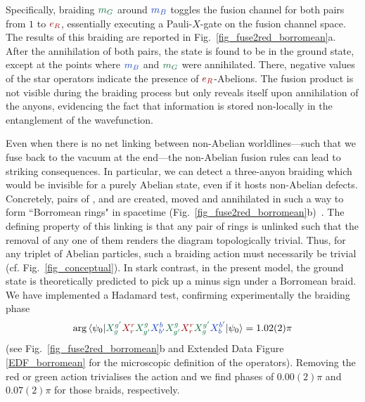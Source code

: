 \documentclass[nofootinbib,pra,twocolumn,showpacs,superscriptaddress,notitlepage,amsmath]{revtex4-2} %
\begin{document}
Specifically, braiding $\green{m_G}$ around $\blue{m_B}$ toggles the fusion channel for both pairs from $1$ to $\red{e_R}$, essentially executing a Pauli-$X$-gate on the fusion channel space. The results of this braiding are reported in Fig.~\ref{fig_fuse2red_borromean}a. After the annihilation of both pairs, the state is found to be in the ground state, except at the points where $\blue{m_B}$ and $\green{m_G}$ were annihilated. There, negative values of the star operators indicate the presence of $\red{e_R}$-Abelions. The fusion product is not visible during the braiding process but only reveals itself upon annihilation of the anyons, evidencing the fact that information is stored non-locally in the entanglement of the wavefunction.

Even when there is no net linking between non-Abelian worldlines---such that we fuse back to the vacuum at the end---the non-Abelian fusion rules can lead to striking consequences. In particular, we can detect a three-anyon braiding which would be invisible for a purely Abelian state, even if it hosts non-Abelian defects. Concretely, pairs of ,  and  are created, moved and annihilated in such a way to form ``Borromean rings" in spacetime (Fig.~\ref{fig_fuse2red_borromean}b)~\cite{wang_topological_2015,WangWenYau20,putrov_braiding_2017,kulkarni_topological_2021, chan_braiding_2018}. The defining property of this linking is that any pair of rings is unlinked such that the removal of any one of them renders the diagram topologically trivial. Thus, for any triplet of Abelian particles, such a braiding action must necessarily be trivial (cf. Fig.~\ref{fig_conceptual}). In stark contrast, in the present model, the ground state is theoretically predicted to pick up a minus sign under a Borromean braid. We have implemented a Hadamard test, confirming experimentally the braiding phase
\begin{equation*}
    \arg\braket{\psi_0| \green{X_g^{g'}} \red{X_r^r} \green{X_{g'}^g} \blue{X_{b'}^b} \green{X_{g'}^g} \red{X_r^r} \green{X_g^{g'}} \blue{X_b^{b'}} |\psi_0} = 1.02(2) \pi
\end{equation*}
(see Fig.~\ref{fig_fuse2red_borromean}b and Extended Data Figure \ref{EDF_borromean} for the microscopic definition of the operators). Removing the red or green action trivialises the action and we find phases of $0.00(2) \pi$ and $0.07(2) \pi$ for those braids, respectively.
\end{document}
